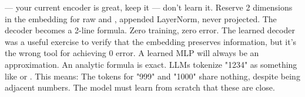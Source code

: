 {}
\markdownRendererSectionEnd \markdownRendererSectionBegin
{}\markdownRendererInterblockSeparator
{}\markdownRendererInterblockSeparator
{}\markdownRendererOlBeginTight
{} — your current encoder is great, keep it\markdownRendererOlItemEnd 
{} — don't learn it. Reserve 2 dimensions in the embedding for raw  and , appended  LayerNorm, never projected. The decoder becomes a 2-line formula. Zero training, zero error.\markdownRendererOlItemEnd 
\markdownRendererOlEndTight \markdownRendererInterblockSeparator
{}The learned decoder was a useful exercise to verify that the embedding preserves information, but it's the wrong tool for achieving 0\markdownRendererPercentSign{} error. A learned MLP will always be an approximation. An analytic formula is exact.\markdownRendererInterblockSeparator
{}\markdownRendererThematicBreak{}\markdownRendererInterblockSeparator
{}
\markdownRendererSectionEnd 
\markdownRendererSectionEnd 
\markdownRendererSectionEnd \markdownRendererSectionBegin
{}\markdownRendererInterblockSeparator
{}\markdownRendererInterblockSeparator
{}\markdownRendererThematicBreak{}\markdownRendererInterblockSeparator
{}\markdownRendererInterblockSeparator
{}\markdownRendererThematicBreak{}\markdownRendererInterblockSeparator
{}\markdownRendererSectionBegin
{}\markdownRendererInterblockSeparator
{}LLMs tokenize "1234" as something like \markdownRendererCodeSpan{["12", "34"]} or \markdownRendererCodeSpan{["1", "234"]}. This means:\markdownRendererInterblockSeparator
{}\markdownRendererUlBeginTight
\markdownRendererUlItem {} The tokens for "999" and "1000" share nothing, despite being adjacent numbers. The model must learn from scratch that these are close.\markdownRendererUlItemEnd 
